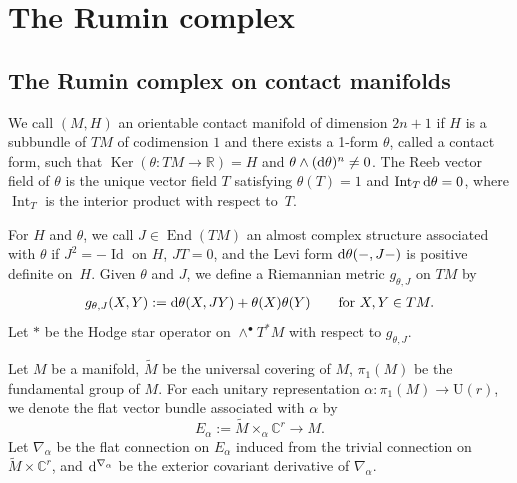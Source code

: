 \documentclass[pdftex]{sigma}
\numberwithin{equation}{section}
\DeclareMathOperator{\End}{End}
\DeclareMathOperator{\Int}{Int}
\DeclareMathOperator{\Ker}{Ker}
\DeclareMathOperator{\Id}{Id}
\newcommand{\bR}{\mathbb{R}}
\newcommand{\bC}{\mathbb{C}}
\begin{document}
\section{The Rumin complex}
\label{sec: The Rumin complex on the spheres}

\subsection{The Rumin complex on contact manifolds}
\label{sec: The Rumin complex on contact manifolds}

We call $(M,H)$ an orientable contact manifold of dimension $2n+1$
if $H$ is a subbundle of $TM$ of codimension $1$
and
there exists a 1-form $\theta$,
called a contact form,
such that
 ${\Ker (\theta \colon TM \! \to \! \bR ) = H}$
and $\theta \wedge ( {\rm d} \theta )^n \not = 0$.
The Reeb vector field of $\theta$ is the unique vector field $T$ satisfying $\theta (T) =1$ and $\Int_T {\rm d} \theta =0$, where $\Int_T$ is the interior product with respect to~$T$.

For $H$ and $\theta$,
we call $J \in \End (TM)$
an almost complex structure associated with $\theta$ if
$J^2 = - \Id $ on $H$, $JT=0$, and the Levi form ${\rm d} \theta ( - , J - )$ is positive definite on~$H$.
Given $\theta $ and $J$, we define a Riemannian metric $g_{\theta , J}$ on $TM$ by
\begin{align*}
g_{\theta , J} (X,Y) := {\rm d} \theta (X , JY) + \theta (X) \theta (Y) \qquad \text{for} \ X,Y \in TM .
\end{align*}
Let $*$ be the Hodge star operator on $\wedge^\bullet T^*M$ with respect to $g_{\theta , J}$.

Let $M$ be a manifold, $\widetilde M$ be the universal covering of $M$,
$\pi_1 (M)$ be the fundamental group of $M$.
For each unitary representation $\alpha \colon \pi_1 (M) \to \mathrm{U} (r )$,
we denote the flat vector bundle associated with $\alpha$ by
\[
 E_{\alpha} := \widetilde M \times_{\alpha} \bC^r \to M .
\]
Let $\nabla_{\alpha}$ be the flat connection on $E_{\alpha}$ induced from the trivial connection on $\widetilde M \times \bC^r$,
and ${\rm d}^{\nabla_{\alpha}}$ be the exterior covariant derivative of $\nabla_{\alpha}$.
\end{document}
